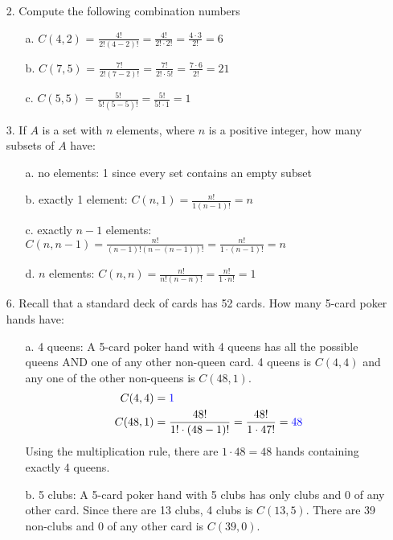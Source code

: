 \documentclass{article}
\begin{document}
\begin{itemize}
    \item[2.] Compute the following combination numbers
    \begin{itemize} 
        \item[a.] $C(4,2)$ {\color{blue}= $\frac{4!}{2!(4-2)!}=\frac{4!}{2!\cdot2!}=\frac{4\cdot3}{2!}=6$}
        \item[b.] $C(7,5)$ {\color{blue}= $\frac{7!}{2!(7-2)!}=\frac{7!}{2!\cdot5!}=\frac{7\cdot6}{2!}=21$}
        \item[c.] $C(5,5)$ {\color{blue}= $\frac{5!}{5!(5-5)!}=\frac{5!}{5!\cdot1}=1$}
    \end{itemize}
    \item[3.] If $A$ is a set with $n$ elements, where $n$ is a positive integer, how many subsets of $A$ have:
    \begin{itemize}
        \item[a.] no elements: {\color{blue} 1 since every set contains an empty subset}
        \item[b.] exactly 1 element: {\color{blue} $C(n,1)=\frac{n!}{1(n-1)!}=n$}
        \item[c.] exactly $n-1$ elements: {\color{blue} $C(n,n-1)=\frac{n!}{(n-1)!(n-(n-1))!}=\frac{n!}{1\cdot(n-1)!}=n$}
        \item[d.] $n$ elements: {\color{blue} $C(n,n)=\frac{n!}{n!(n-n)!}=\frac{n!}{1\cdot n!}=1$}
    \end{itemize}
    \item[6.] Recall that a standard deck of cards has 52 cards.  How many 5-card poker hands have:
    \begin{itemize}
        \item[a.] 4 queens: A 5-card poker hand with 4 queens has all the possible queens AND one of any other non-queen card.  4 queens is $C(4,4)$ and any one of the other non-queens is $C(48,1)$.
        \begin{align}
            C(4,4)&={\color{blue}1}\nonumber\\
            C(48,1)&=\frac{48!}{1!\cdot(48-1)!}=\frac{48!}{1\cdot47!}={\color{blue}48}\nonumber
        \end{align}
        {\color{blue} Using the multiplication rule, there are $1\cdot48=48$ hands containing exactly 4 queens.}
        \item[b.] 5 clubs: A 5-card poker hand with 5 clubs has only clubs and 0 of any other card.  Since there are 13 clubs, 4 clubs is $C(13,5)$.  There are 39 non-clubs and 0 of any other card is $C(39,0)$.

\end{itemize}
\end{itemize}
\end{document}
